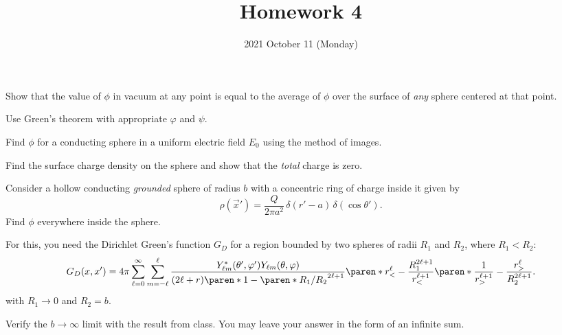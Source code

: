 \documentclass{phys151}
\title{Homework 4}
\date{2021 October 11 (Monday)}
\author{}
\begin{document}
\begin{problem}
  Show that the value of \(\phi\) in vacuum at any point is equal to the
  average of \(\phi\) over the surface of \emph{any} sphere centered at that
  point.
  \begin{hint}
    Use Green's theorem with appropriate \(\varphi\) and \(\psi\).
  \end{hint}
\end{problem}

\begin{solution}

\end{solution}

\begin{problem}
  \begin{subproblems}
  \item Find \(\phi\) for a conducting sphere in a uniform electric field
    \(E_0\) using the method of images.
  \item Find the surface charge density on the sphere and show that the
    \emph{total} charge is zero.
  \end{subproblems}
\end{problem}

\begin{solution}

\end{solution}

\begin{problem}
  Consider a hollow conducting \emph{grounded} sphere of radius \(b\) with a
  concentric ring of charge inside it given by
  \[
    \rho(\vec x') = \frac Q {2 \pi a^2} \, \delta(r'-a) \, \delta(\cos \theta').
  \]
  Find \(\phi\) everywhere inside the sphere.
  \begin{hint}
    For this, you need the Dirichlet Green's function \(G_D\) for a region
    bounded by two spheres of radii \(R_1\) and \(R_2\), where \(R_1 < R_2\):
    \[
      G_D(x, x') = 4 \pi \sum_{\ell=0}^\infty \sum_{m=-\ell}^\ell
      \frac
      {Y_{\ell m}^* (\theta', \varphi') Y_{\ell m} (\theta, \varphi)}
      {(2\ell+r) \paren* {1 - \paren* {R_1/R_2}^{2\ell+1}}}
      \paren* {r_<^\ell - \frac {R_1^{2\ell+1}} {r_<^{\ell+1}}}
      \paren* {\frac 1 {r_>^{\ell+1}} - \frac {r_>^\ell} {R_2^{2\ell+1}}}.
    \]
    with \(R_1 \to 0\) and \(R_2 = b\).
  \end{hint}
  Verify the \(b \to \infty\) limit with the result from class.  You may leave
  your answer in the form of an infinite sum.
\end{problem}
\end{document}
